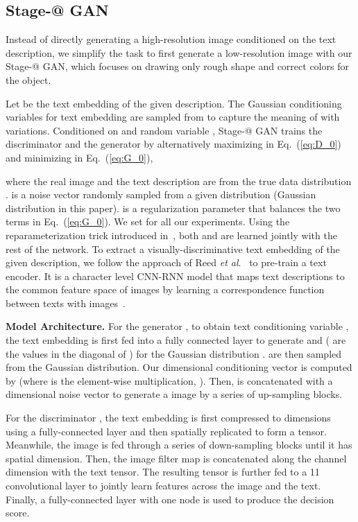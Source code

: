 \documentclass[10pt,journal,letterpaper,compsoc]{IEEEtran}
\makeatletter
\newcommand{\Rmnum}[1]{\expandafter\@slowromancap\romannumeral #1@}
\makeatother
\begin{document}
\subsection{Stage-\Rmnum{1} GAN}
Instead of directly generating a high-resolution image conditioned on the text description, we simplify the task to first generate a low-resolution image with our Stage-\Rmnum{1} GAN, which focuses on drawing only rough shape and correct colors for the object. 


Let  be the text embedding of the given description. The Gaussian conditioning variables  for text embedding are sampled from  to capture the meaning of  with variations. Conditioned on  and random variable , Stage-\Rmnum{1} GAN trains the discriminator  and the generator  by alternatively maximizing  in Eq.~(\ref{eq:D_0}) and minimizing  in Eq.~(\ref{eq:G_0}), 


where the real image  and the text description  are from the true data distribution .  is a noise vector randomly sampled from a given distribution  (Gaussian distribution in this paper).  is a regularization parameter that balances the two terms in Eq.~(\ref{eq:G_0}). We set  for all our experiments.  Using the reparameterization trick introduced in~\cite{KingmaW14}, both  and  are learned jointly with the rest of the network.  To extract a visually-discriminative text embedding of the given description, we follow the approach of Reed \emph{et al}.~\cite{reed2016cvpr} to pre-train a text encoder. It is a character level CNN-RNN model that maps text descriptions to the common feature space of images by learning a correspondence function between texts with images~\cite{reed2016cvpr}. 


\textbf{Model Architecture. }
For the generator , to obtain text conditioning variable , the text embedding  is first fed into a fully connected layer to generate  and  ( are the values in the diagonal of ) for the Gaussian distribution .  are then sampled from the Gaussian distribution.
Our  dimensional conditioning vector  is computed by  (where  is the element-wise multiplication, ). 
Then,  is concatenated with a  dimensional noise vector to generate a  image by a series of up-sampling blocks.  

For the discriminator , the text embedding  is first compressed to  dimensions using a fully-connected layer and then spatially replicated to form a  tensor. 
Meanwhile, the image is fed through a series of down-sampling blocks until it has  spatial dimension. 
Then, the image filter map is concatenated along the channel dimension with the text tensor. 
The resulting tensor is further fed to a 11 convolutional layer to jointly learn features across the image and the text. 
Finally, a fully-connected layer with one node is used to produce the decision score. 
\end{document}
